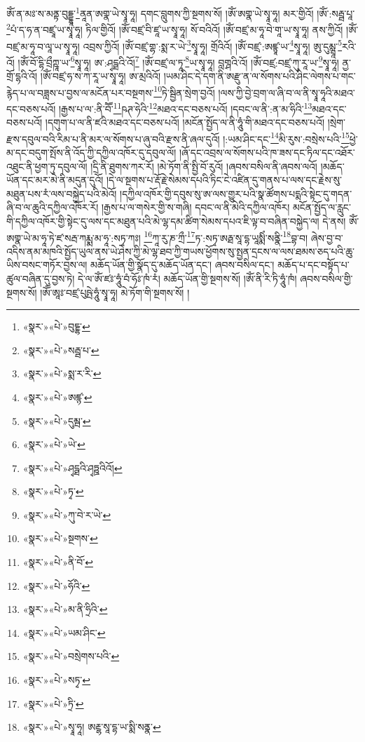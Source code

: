 ཨོཾ་ན་མཿ་ས་མནྟ་བུདྡྷཱ་\footnote{«སྣར་»«པེ་»བུངྔྷ་}ནཱན་ཨགྣ་ཡེ་སྭཱ་ཧཱ། དགང་བླུགས་ཀྱི་སྔགས་སོ། །ཨོཾ་ཨགྣ་ཡེ་སྭཱ་ཧཱ། མར་གྱིའོ། །ཨོཾ་:སརྦྦ་པཱ་\footnote{«སྣར་»«པེ་»སརྦྦ་པ་}པཾ་ད་ཧ་ན་བཛྲཱ་ཡ་སྭཱ་ཧཱ། ཏིལ་གྱིའོ། །ཨོཾ་བཛྲ་བི་ཛཱ་ཡ་སྭཱ་ཧཱ། སོ་བའིའོ། །ཨོཾ་བཛྲ་མ་ཧཱ་བེ་གཱ་ཡ་སྭཱ་ཧཱ། ནས་ཀྱིའོ། །ཨོཾ་བཛྲ་མ་ཧཱ་བ་ལཱ་ཡ་སྭཱ་ཧཱ། འབྲས་ཀྱིའོ། །ཨོཾ་བཛྲ་གྷ་:སྨ་ར་ཡེ་\footnote{«སྣར་»«པེ་»སྨ་ར་རི་}སྭཱ་ཧཱ། གྲོའིའོ། །ཨོཾ་བཛྲ་:ཨཛྙཱ་ཡ་\footnote{«སྣར་»«པེ་»ཨཛྙ་}སྭཱ་ཧཱ། ཨུ་དུམྺཱ་\footnote{«སྣར་»«པེ་»དུམྦ་}རའི་འོ། །ཨོཾ་བོ་དྷི་བྲྀཀྵཱ་ཡ་\footnote{«སྣར་»«པེ་»ཡེ་}སྭཱ་ཧཱ། ཨ་:ཤྭདྠའི་འོ།\footnote{«སྣར་»«པེ་»ཤྭདྠའི་ཤྭཏྛའིའོ།} །ཨོཾ་བཛྲ་ལ་ཏཱ་\footnote{«སྣར་»«པེ་»ཏྭ་}ཡ་སྭཱ་ཧཱ། བླགྴའི་འོ། །ཨོཾ་བཛྲ:བཛྲ་ཀུ་རཱ་ཡ་\footnote{«སྣར་»«པེ་»ཀུ་བེ་ར་ཡེ་}སྭཱ་ཧཱ། ནྱ་གྲོ་དྷའི་འོ། །ཨོཾ་བཛྲ་ཧ་ས་ཀ་རཱ་ཡ་སྭཱ་ཧཱ། ཨ་མྲའིའོ། །ཡམ་ཤིང་དེ་དག་ནི་ཨརྫུ་ན་ལ་སོགས་པའི་ཤིང་ལེགས་པ་གང་རྙེད་པ་ལ་བཟླས་པ་བྱས་ལ་མངོན་པར་བསྔགས་\footnote{«སྣར་»«པེ་»སྔགས་}ཏེ་སྦྱིན་སྲེག་བྱའོ། །ལས་ཀྱི་བྱེ་བྲག་ལ་ཞི་བ་ལ་ནི་སྭཱ་ཧཱའི་མཐའ་དང་བཅས་པའོ། །རྒྱས་པ་ལ་:ནི་བཽ་\footnote{«སྣར་»«པེ་»ནི་བོ་}ཥཊ་ཧེའི་\footnote{«སྣར་»«པེ་»ཧོའི་}མཐའ་དང་བཅས་པའོ། །དབང་ལ་ནི་:ན་མ་ཧིའི་\footnote{«སྣར་»«པེ་»མ་ནི་ཧྲིའི་}མཐའ་དང་བཅས་པའོ། །དགུག་པ་ལ་ནི་ཛའི་མཐའ་དང་བཅས་པའོ། །མངོན་སྤྱོད་ལ་ནི་ཧཱུཾ་གི་མཐའ་དང་བཅས་པའོ། །སྲེག་རྫས་དབུལ་བའི་རིམ་པ་ནི་མར་ལ་སོགས་པ་ཞུ་བའི་རྫས་ནི་ཞལ་དུའོ། །:ཡམ་ཤིང་དང་\footnote{«སྣར་»«པེ་»ཡམ་ཤིང་}མི་རུས་:བསྲེས་པའི་\footnote{«སྣར་»«པེ་»བསྲེགས་པའི་}ཕྱེ་མ་དང་བདུག་སྤོས་ནི་འོད་ཀྱི་དཀྱིལ་འཁོར་དུ་དབུལ་ལོ། །ཞོ་དང་འབྲས་ལ་སོགས་པའི་ཁ་ཟས་དང་ཏིལ་དང་འཐོར་འཐུང་ནི་ཕྱག་ཏུ་དབུལ་ལོ། །དྲི་ནི་ཐུགས་ཀར་རོ། །མེ་ཏོག་ནི་སྤྱི་བོ་རུའོ། །ཞབས་བསིལ་ནི་ཞབས་ལའོ། །མཆོད་ཡོན་དང་མར་མེ་ནི་མདུན་དུའོ། །དེ་ལ་སྔགས་པ་རྡོ་རྗེ་སེམས་དཔའི་ཏིང་ངེ་འཛིན་དུ་གནས་པ་ལས་དང་རྗེས་སུ་མཐུན་པས་རཾ་ལས་བསྐྱེད་པའི་མེའོ། །དཀྱིལ་འཁོར་གྱི་དབུས་སུ་ཨ་ལས་གྱུར་པའི་སྣ་ཚོགས་པདྨའི་སྟེང་དུ་གདན་ཞི་བ་ལ་ཆུའི་དཀྱིལ་འཁོར་རོ། །རྒྱས་པ་ལ་གསེར་གྱི་ས་གཞི། དབང་ལ་ནི་མེའི་དཀྱིལ་འཁོར། མངོན་སྤྱོད་ལ་རླུང་གི་དཀྱིལ་འཁོར་གྱི་སྟེང་དུ་ལས་དང་མཐུན་པའི་མེ་ལྷ་དམ་ཚིག་སེམས་དཔའ་ཇི་ལྟ་བ་བཞིན་བསྐྱེད་ལ། དེ་ནས། ཨོཾ་ཨགྣ་ཡེ་མ་ཧཱ་ཏེ་ཛ་སརྦ་ཀརྨྨ་མ་ཧཱ་:སཏྭ་ཀཿ། \footnote{«སྣར་»«པེ་»སཏྭ་}ཀཱ་རུ་ཎ་ཀྲྀ་\footnote{«སྣར་»«པེ་»ཏྲི་}ཏ་:སཏྭ་ཨརྠ་སཱ་དྷ་ཡཱསྨིཾ་སནྣི་\footnote{«སྣར་»«པེ་»སྭཱ་ཧཱ། ཨརྔྷ་སཱ་དྷ་ཡ་སྨི་སནྣ་}བྷ་བ། ཞེས་བྱ་བ་འདིས་ནམ་མཁའི་སྤྱོད་ཡུལ་ནས་ཡེ་ཤེས་ཀྱི་མེ་ལྷ་ཐབ་ཀྱི་གཡས་ཕྱོགས་སུ་སྤྱན་དྲངས་ལ་ལས་ཐམས་ཅད་པའི་ཆུ་ཡིས་བསང་གཏོར་བྱས་ལ། མཆོད་ཡོན་གྱི་སྣོད་དུ་མཆོད་ཡོན་དང་། ཞབས་བསིལ་དང་། མཆོད་པ་དང་བསྟོད་པ་ཚུལ་བཞིན་དུ་བྱས་ཏེ། དེ་ལ་ཨོཾ་ཛཿ་ཧཱུཾ་བཾ་ཧོཿ་ཁཾ་རཾ། མཆོད་ཡོན་གྱི་སྔགས་སོ། །ཨོཾ་ནི་རི་ཏི་ཧཱུཾ་ཁཾ། ཞབས་བསིལ་གྱི་སྔགས་སོ། །ཨོཾ་ཨཱཿ་བཛྲ་པུཥྤེ་ཧཱུཾ་སྭཱ་ཧཱ། མེ་ཏོག་གི་སྔགས་སོ། །

